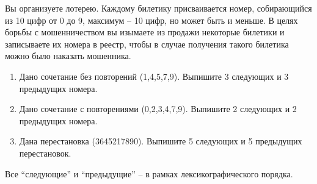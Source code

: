 \question
Вы организуете лотерею. Каждому билетику присваивается номер, собирающийся из 10 цифр от 0 до 9, максимум – 10 цифр, но может быть и меньше. В целях борьбы с мошенничеством вы изымаете из продажи некоторые билетики и записываете их номера в реестр, чтобы в случае получения такого билетика можно было наказать мошенника.

\begin{enumerate}
\item Дано сочетание без повторений (1,4,5,7,9). Выпишите 3 следующих и 3 предыдущих номера.
	\item Дано сочетание с повторениями (0,2,3,4,7,9). Выпишите 2 следующих и 2 предыдущих номера.
	\item Дана перестановка (3645217890). Выпишите 5 следующих и 5 предыдущих перестановок.
\end{enumerate}

Все “следующие” и “предыдущие” – в рамках лексикографического порядка.
